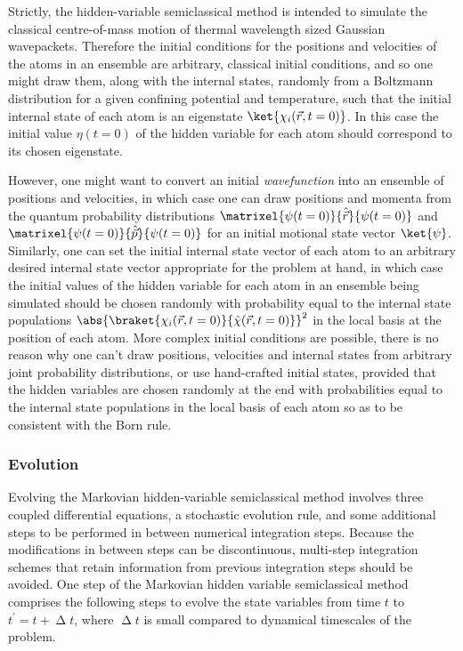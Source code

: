 Strictly, the hidden-variable semiclassical method is intended to simulate the classical centre-of-mass motion of thermal wavelength sized Gaussian wavepackets. Therefore the initial conditions for the positions and velocities of the atoms in an ensemble are arbitrary, classical initial conditions, and so one might draw them, along with the internal states, randomly from a Boltzmann distribution for a given confining potential and temperature, such that the initial internal state of each atom is an eigenstate $\ket{\chi_i(\vec r, t=0)}$. In this case the initial value $\eta(t=0)$ of the hidden variable for each atom should correspond to its chosen eigenstate.

However, one might want to convert an initial \emph{wavefunction} into an ensemble of positions and velocities, in which case one can draw positions and momenta from the quantum probability distributions $\matrixel{\psi(t=0)}{\hat{\vec r}}{\psi(t=0)}$ and $\matrixel{\psi(t=0)}{\hat{\vec p}}{\psi(t=0)}$ for an initial motional state vector $\ket{\psi}$.
Similarly, one can set the initial internal state vector of each atom to an arbitrary desired internal state vector appropriate for the problem at hand, in which case the initial values of the hidden variable for each atom in an ensemble being simulated should be chosen randomly with probability equal to the internal state populations $\abs{\braket{\chi_i(\vec r, t=0)}{\tilde\chi(\vec r, t=0)}}^2$ in the local basis at the position of each atom.
More complex initial conditions are possible, there is no reason why one can't draw positions, velocities and internal states from arbitrary joint probability distributions, or use hand-crafted initial states, provided that the hidden variables are chosen randomly at the end with probabilities equal to the internal state populations in the local basis of each atom so as to be consistent with the Born rule.

\subsubsection{Evolution}

Evolving the Markovian hidden-variable semiclassical method involves three coupled differential equations, a stochastic evolution rule, and some additional steps to be performed in between numerical integration steps. Because the modifications in between steps can be discontinuous, multi-step integration schemes that retain information from previous integration steps should be avoided. One step of the Markovian hidden variable semiclassical method comprises the following steps to evolve the state variables from time $t$ to $t^\prime = t + \upDelta t$, where $\upDelta t$ is small compared to dynamical timescales of the problem.

